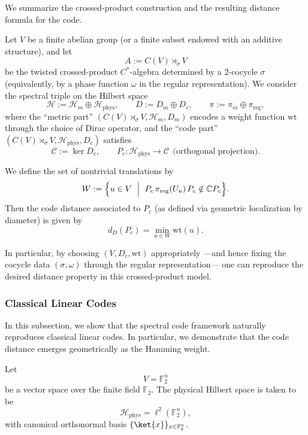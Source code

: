 \documentclass[12pt]{article}
\theoremstyle{definition} %
\theoremstyle{plain} %
\theoremstyle{remark} %
\theoremstyle{underline}
\begin{document}
We summarize the crossed-product construction and the resulting distance formula for the code.

Let $V$ be a finite abelian group (or a finite subset endowed with an additive structure), and let
\[
    A:=C(V)\rtimes_{\sigma} V
\]
be the twisted crossed-product $C^*$-algebra determined by a $2$-cocycle $\sigma$ (equivalently, by a phase function $\omega$ in the regular representation).
We consider the spectral triple on the Hilbert space
\[
    \mathcal{H}:=\mathcal{H}_m\oplus \mathcal{H}_{\mathrm{phys}},
    \qquad
    D:=D_m\oplus D_c,
    \qquad
    \pi:=\pi_m\oplus \pi_{\mathrm{reg}},
\]
where the ``metric part'' $(C(V)\rtimes_\sigma V,\mathcal{H}_m,D_m)$ encodes a weight function $\mathrm{wt}$ through the choice of Dirac operator, and the ``code part'' $(C(V)\rtimes_\sigma V,\mathcal{H}_{\mathrm{phys}},D_c)$ satisfies
\[
    \mathcal{C}:=\ker D_c,\qquad
    P_c:\mathcal{H}_{\mathrm{phys}}\to \mathcal{C}
    \ \ \text{(orthogonal projection)}.
\]

We define the set of nontrivial translations by
\[
    W:=\Bigl\{u\in V\ \Bigm|\ P_c\,\pi_{\mathrm{reg}}(U_u)\,P_c \notin \mathbb{C}P_c\Bigr\}.
\]
Then the code distance associated to $P_c$ (as defined via geometric localization by diameter) is given by
\[
    d_D(P_c)=\min_{u\in W}\mathrm{wt}(u).
\]

In particular, by choosing $(V,D_c,\mathrm{wt})$ appropriately —and hence fixing the cocycle data $(\sigma,\omega)$ through the regular representation— one can reproduce the desired distance property in this crossed-product model.



\subsubsection{Classical Linear Codes}

In this subsection, we show that the spectral code framework naturally reproduces classical linear codes. In particular, we demonstrate that the code distance emerges geometrically as the Hamming weight.

Let
\[
    V=\mathbb{F}_2^n
\]
be a vector space over the finite field $\mathbb{F}_2$.
The physical Hilbert space is taken to be
\[
    \mathcal{H}_{\mathrm{phys}}=\ell^2(\mathbb{F}_2^n),
\]
with canonical orthonormal basis $\{\ket{x}\}_{x\in\mathbb{F}_2^n}$.
\end{document}
